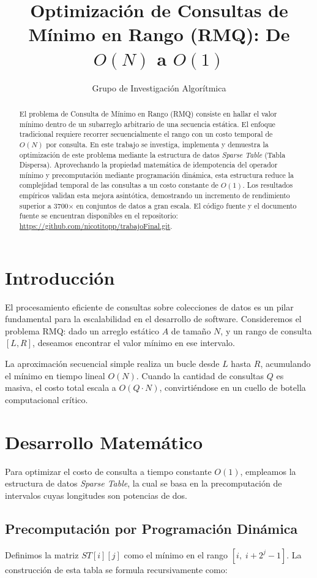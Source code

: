 \documentclass[twocolumn]{article}
\title{Optimización de Consultas de Mínimo en Rango (RMQ): De $O(N)$ a $O(1)$}
\author{Grupo de Investigación Algorítmica}
\begin{document}
\maketitle

\begin{abstract}
El problema de Consulta de Mínimo en Rango (RMQ) consiste en hallar el valor mínimo dentro de un subarreglo arbitrario de una secuencia estática. El enfoque tradicional requiere recorrer secuencialmente el rango con un costo temporal de $O(N)$ por consulta. En este trabajo se investiga, implementa y demuestra la optimización de este problema mediante la estructura de datos \textit{Sparse Table} (Tabla Dispersa). Aprovechando la propiedad matemática de idempotencia del operador mínimo y precomputación mediante programación dinámica, esta estructura reduce la complejidad temporal de las consultas a un costo constante de $O(1)$. Los resultados empíricos validan esta mejora asintótica, demostrando un incremento de rendimiento superior a 3700$\times$ en conjuntos de datos a gran escala. El código fuente y el documento fuente se encuentran disponibles en el repositorio: \url{https://github.com/nicotitopp/trabajoFinal.git}.
\end{abstract}

\section{Introducción}
El procesamiento eficiente de consultas sobre colecciones de datos es un pilar fundamental para la escalabilidad en el desarrollo de software. Consideremos el problema RMQ: dado un arreglo estático $A$ de tamaño $N$, y un rango de consulta $[L, R]$, deseamos encontrar el valor mínimo en ese intervalo.

La aproximación secuencial simple realiza un bucle desde $L$ hasta $R$, acumulando el mínimo en tiempo lineal $O(N)$. Cuando la cantidad de consultas $Q$ es masiva, el costo total escala a $O(Q \cdot N)$, convirtiéndose en un cuello de botella computacional crítico.

\section{Desarrollo Matemático}
Para optimizar el costo de consulta a tiempo constante $O(1)$, empleamos la estructura de datos \textit{Sparse Table}, la cual se basa en la precomputación de intervalos cuyas longitudes son potencias de dos.

\subsection{Precomputación por Programación Dinámica}
Definimos la matriz $ST[i][j]$ como el mínimo en el rango $[i, \; i + 2^j - 1]$. La construcción de esta tabla se formula recursivamente como:
\end{document}
